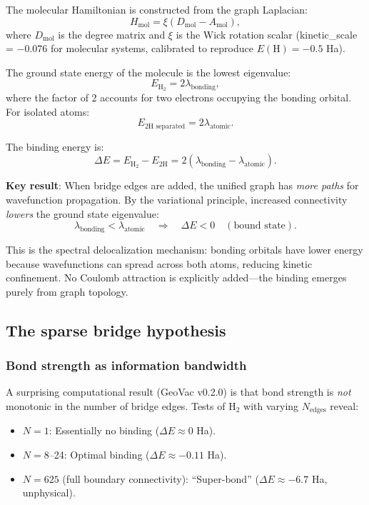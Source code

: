 \documentclass[aps,prd,twocolumn,superscriptaddress,groupedaddress,showpacs]{revtex4-2}
\begin{document}
The molecular Hamiltonian is constructed from the graph Laplacian:
\begin{equation}
H_{\text{mol}} = \xi (D_{\text{mol}} - A_{\text{mol}}),
\end{equation}
where $D_{\text{mol}}$ is the degree matrix and $\xi$ is the Wick rotation scalar (kinetic\_scale = $-0.076$ for molecular systems, calibrated to reproduce $E(\text{H}) = -0.5$ Ha).

The ground state energy of the molecule is the lowest eigenvalue:
\begin{equation}
E_{\text{H}_2} = 2 \lambda_{\text{bonding}},
\end{equation}
where the factor of 2 accounts for two electrons occupying the bonding orbital. For isolated atoms:
\begin{equation}
E_{\text{2H separated}} = 2 \lambda_{\text{atomic}}.
\end{equation}

The binding energy is:
\begin{equation}
\Delta E = E_{\text{H}_2} - E_{\text{2H}} = 2(\lambda_{\text{bonding}} - \lambda_{\text{atomic}}).
\end{equation}

\textbf{Key result}: When bridge edges are added, the unified graph has \emph{more paths} for wavefunction propagation. By the variational principle, increased connectivity \emph{lowers} the ground state eigenvalue:
\begin{equation}
\lambda_{\text{bonding}} < \lambda_{\text{atomic}} \quad \Rightarrow \quad \Delta E < 0 \quad (\text{bound state}).
\end{equation}

This is the spectral delocalization mechanism: bonding orbitals have lower energy because wavefunctions can spread across both atoms, reducing kinetic confinement. No Coulomb attraction is explicitly added---the binding emerges purely from graph topology.

\subsection{The sparse bridge hypothesis}

\subsubsection{Bond strength as information bandwidth}

A surprising computational result (GeoVac v0.2.0) is that bond strength is \emph{not} monotonic in the number of bridge edges. Tests of H$_2$ with varying $N_{\text{edges}}$ reveal:
\begin{itemize}
\item $N = 1$: Essentially no binding ($\Delta E \approx 0$ Ha).
\item $N = 8$--24: Optimal binding ($\Delta E \approx -0.11$ Ha).
\item $N = 625$ (full boundary connectivity): ``Super-bond'' ($\Delta E \approx -6.7$ Ha, unphysical).
\end{itemize}
\end{document}
